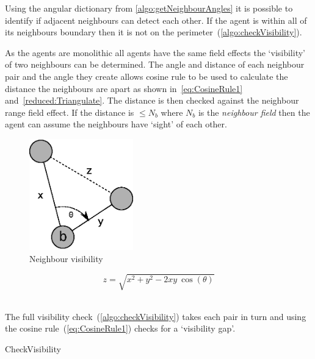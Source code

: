 Using the angular dictionary from \autoref{algo:getNeighbourAngles} it is possible to identify if adjacent neighbours can detect each other. If the agent is within all of its neighbours boundary then it is not on the perimeter~(\autoref{algo:checkVisibility}). 

As the agents are monolithic all agents have the same field effects the `visibility' of two neighbours can be determined. The angle and distance of each neighbour pair and the angle they create allows cosine rule to be used to calculate the distance the neighbours are apart as shown in~\autoref{eq:CosineRule1} and~\autoref{reduced:Triangulate}. The distance is then checked against the neighbour range field effect. If the distance is $\leq N_b$ where $N_b$ is the \textit{neighbour field} then the agent can assume the neighbours have `sight' of each other. 

\begin{figure}[H]
\begin{center}
\includegraphics[width=4.5cm]{CHAPTER-6/figures/Triangulate}
\end{center}
\caption{Neighbour visibility\label{reduced:Triangulate}}
\end{figure}

\begin{equation}\label{eq:CosineRule1}
z = \sqrt{x^2 + y^2 - 2xy~\cos(\theta)}
\end{equation}‎

The full visibility check~(\autoref{algo:checkVisibility}) takes each pair in turn and using the cosine rule~(\autoref{eq:CosineRule1}) checks for a `visibility gap'. 

\begin{algorithm}[H]
\DontPrintSemicolon
\SetAlgoLined
\caption{CheckVisibility}
\label{algo:checkVisibility}
\end{algorithm}

